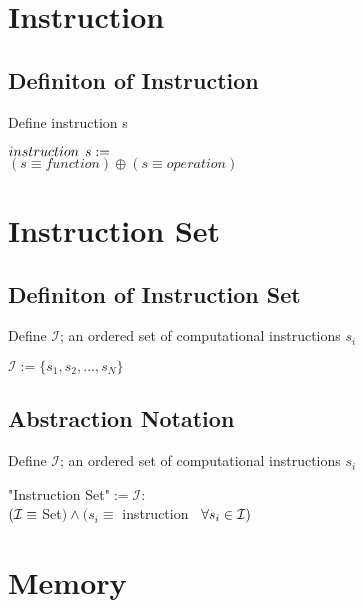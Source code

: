 \documentclass[11pt]{article}
\begin{document}
\section{Instruction}
\subsection{Definiton of Instruction}
Define instruction s
\begin{center}
$
instruction \hspace{1.5mm} s :=
$
\\ \vspace{2mm}
$
(s \equiv function) \oplus (s \equiv operation)
$
\end{center}

\section{Instruction Set}
\subsection{Definiton of Instruction Set}
Define $\mathcal{I}$; an ordered set of computational instructions $s_i$
\begin{center}
$
\mathcal{I} := \{ s_1,s_2,...,s_{N}\}
$
\end{center}



\subsection{Abstraction Notation}
Define $\mathcal{I}$; an ordered set of computational instructions $s_i$
\begin{center}
"Instruction Set"$ := \mathcal{I}:
$
\\ \vspace{2mm}
$
(\mathcal{I} \equiv \hspace{1mm} $Set$) \land (s_i \equiv$ instruction$ \hspace{3mm} \forall s_i \in \mathcal{I})
$
\end{center}











\newpage

\section{Memory}
\end{document}
